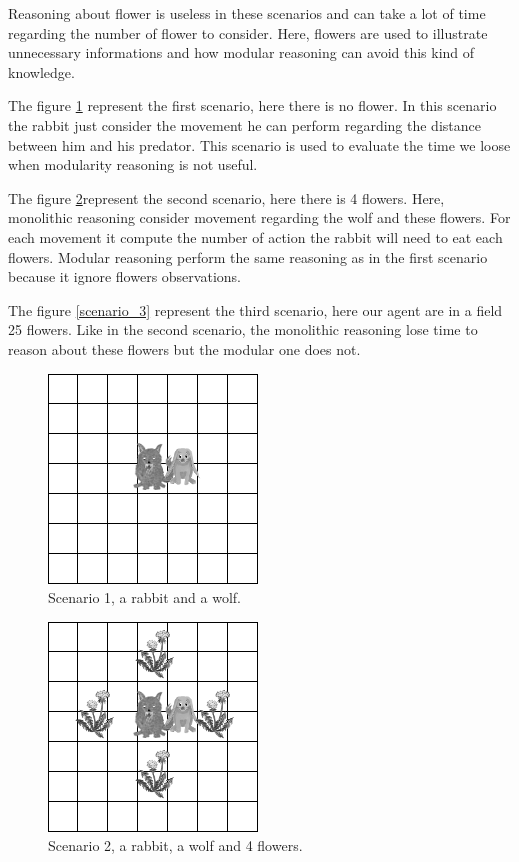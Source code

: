 \documentclass{aamas2012}
\begin{document}
	Reasoning about flower is useless in these scenarios and can take a lot of time regarding the number of flower to consider.
	Here, flowers are used to illustrate unnecessary informations and how modular reasoning can avoid this kind of knowledge.
	
	
	The figure \ref{scenario_1} represent the first scenario, here there is no flower.
	In this scenario the rabbit just consider the movement he can perform regarding the distance between him and his predator.
	This scenario is used to evaluate the time we loose when modularity reasoning is not useful.
	
	The figure \ref{scenario_2}represent the second scenario, here there is 4 flowers.
	Here, monolithic reasoning consider movement regarding the wolf and these flowers.
	For each movement it compute the number of action the rabbit will need to eat each flowers.
	Modular reasoning perform the same reasoning as in the first scenario because it ignore flowers observations.
	
	The figure \ref{scenario_3} represent the third scenario, here our agent are in a field 25 flowers.
	Like in the second scenario, the monolithic reasoning lose time to reason about these flowers but the modular one does not.
	
	\begin{figure}
		\centering
		\includegraphics[keepaspectratio=true, scale=0.5]{scenario_1.png}
		\caption
		{
			\label{scenario_1}
			Scenario 1, a rabbit and a wolf.
		}
	\end{figure}

	\begin{figure}
		\centering
		\includegraphics[keepaspectratio=true, scale=0.5]{scenario_2.png}
		\caption
		{
			\label{scenario_2}
			Scenario 2, a rabbit, a wolf and 4 flowers.
		}
	\end{figure}
	
\end{document}
